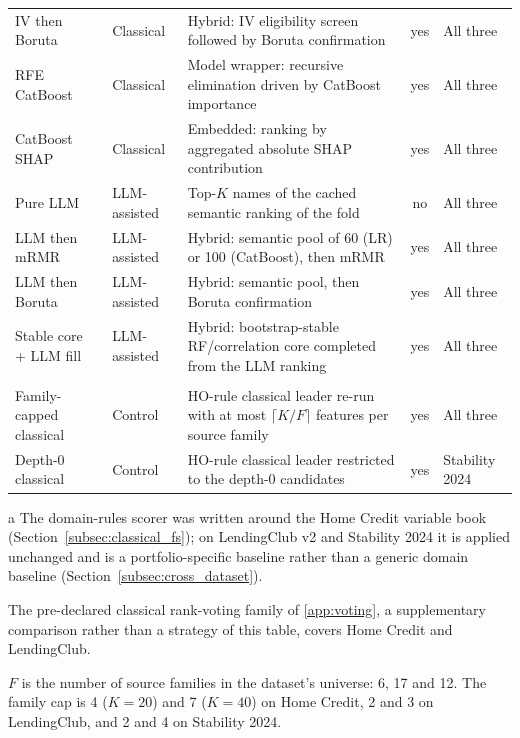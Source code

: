 \documentclass[final,5p,twocolumn]{elsarticle}
\newcommand{\Kfeat}{K}
\providecommand{\DIFaddendFL}{} %
\begin{document}
\begin{table}[htbp]
\begin{threeparttable}
\begin{tabular}{@{}llL{46mm}cl@{}}
IV then Boruta & Classical & Hybrid: IV eligibility screen followed by Boruta confirmation & yes & All three \\
RFE CatBoost & Classical & Model wrapper: recursive elimination driven by CatBoost importance & yes & All three \\
CatBoost SHAP & Classical & Embedded: ranking by aggregated absolute SHAP contribution & yes & All three \\
Pure LLM & LLM-assisted & Top-$\Kfeat$ names of the cached semantic ranking of the fold & no & All three \\
LLM then mRMR & LLM-assisted & Hybrid: semantic pool of 60 (LR) or 100 (CatBoost), then mRMR & yes & All three \\
LLM then Boruta & LLM-assisted & Hybrid: semantic pool, then Boruta confirmation & yes & All three \\
Stable core + LLM fill & LLM-assisted & Hybrid: bootstrap-stable RF/correlation core completed from the LLM ranking & yes & All three \\
\addlinespace
{} \\
Family-capped classical & Control & HO-rule classical leader re-run with at most $\lceil \Kfeat/F\rceil$ features per source family & yes & All three \\
Depth-0 classical & Control & HO-rule classical leader restricted to the depth-0 candidates & yes & Stability 2024 \\
\bottomrule
\end{tabular}
\DIFaddendFL \begin{tablenotes}\footnotesize
\item[a] The domain-rules scorer was written around the Home Credit variable book (Section~\ref{subsec:classical_fs}); on LendingClub v2 and Stability 2024 it is applied unchanged and is a portfolio-specific baseline rather than a generic domain baseline (Section~\ref{subsec:cross_dataset}).
\item The pre-declared classical rank-voting family of \ref{app:voting}, a supplementary comparison rather than a strategy of this table, covers Home Credit and LendingClub.
\item $F$ is the number of source families in the dataset's universe: 6, 17 and 12. The family cap is 4 ($\Kfeat=20$) and 7 ($\Kfeat=40$) on Home Credit, 2 and 3 on LendingClub, and 2 and 4 on Stability 2024.
\end{tablenotes}
\end{threeparttable}
\end{table}
\end{document}
